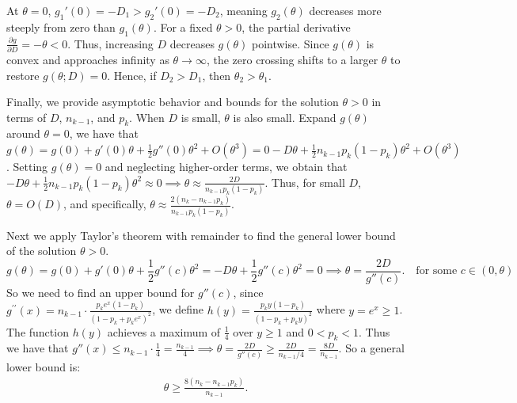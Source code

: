\documentclass[preprint]{article}
\theoremstyle{plain}
\theoremstyle{definition}
\theoremstyle{remark}
\begin{document}
At \(\theta = 0\), \(g_1'(0) = -D_1 > g_2'(0) = -D_2\), meaning \(g_2(\theta)\) decreases more steeply from zero than \(g_1(\theta)\). For a fixed \(\theta > 0\), the partial derivative \(\frac{\partial g}{\partial D} = -\theta < 0\). Thus, increasing \(D\) decreases \(g(\theta)\) pointwise. Since \(g(\theta)\) is convex and approaches infinity as \(\theta \to \infty\), the zero crossing shifts to a larger \(\theta\) to restore \(g(\theta; D) = 0\). Hence, if \(D_2 > D_1\), then \(\theta_2 > \theta_1\).

Finally, we provide asymptotic behavior and bounds for the solution \(\theta>0\) in terms of \(D\), \(n_{k-1}\), and \(p_k\). When \(D\) is small, \(\theta\) is also small. Expand \(g(\theta)\) around \(\theta = 0\), we have that $g(\theta) = g(0) + g'(0) \theta + \frac{1}{2} g''(0) \theta^2 + O(\theta^3) = 0 - D \theta + \frac{1}{2} n_{k-1} p_k (1 - p_k) \theta^2 + O(\theta^3)$. Setting \(g(\theta) = 0\) and neglecting higher-order terms, we obtain that $-D \theta + \frac{1}{2} n_{k-1} p_k (1 - p_k) \theta^2 \approx 0 \implies \theta \approx \frac{2D}{n_{k-1} p_k (1 - p_k)}$. Thus, for small \(D\), \(\theta = O(D)\), and specifically, $\theta \approx \frac{2 (n_k - n_{k-1} p_k)}{n_{k-1} p_k (1 - p_k)}$.

Next we apply Taylor's theorem with remainder to find the general lower bound of the solution $\theta>0$.
$$g(\theta) = g(0) + g'(0) \theta + \frac{1}{2} g''(c) \theta^2 = -D \theta + \frac{1}{2} g''(c) \theta^2 = 0\implies \theta = \frac{2D}{g''(c)}. \quad \text{for some } c \in (0, \theta)$$
So we need to find an upper bound for \(g''(c)\), since $g^{\prime \prime}(x) = n_{k-1} \cdot \frac{p_k e^{x} (1 - p_k)}{(1 - p_k + p_k e^{x})^2}$, we define \(h(y) = \frac{p_k y (1 - p_k)}{(1 - p_k + p_k y)^2}\) where \(y = e^{x} \geq 1\). The function \(h(y)\) achieves a maximum of \(\frac{1}{4}\) over $y\geq 1$ and $0<p_k<1$. Thus we have that $
g''(x) \leq n_{k-1} \cdot \frac{1}{4} = \frac{n_{k-1}}{4} \implies \theta = \frac{2D}{g''(c)} \geq \frac{2D}{n_{k-1}/4} = \frac{8D}{n_{k-1}}$. So a general lower bound is:
\begin{align}
    \theta \geq \frac{8 (n_k - n_{k-1} p_k)}{n_{k-1}}.\label{eq::theta lower bound}
\end{align}

% 
\end{document}
